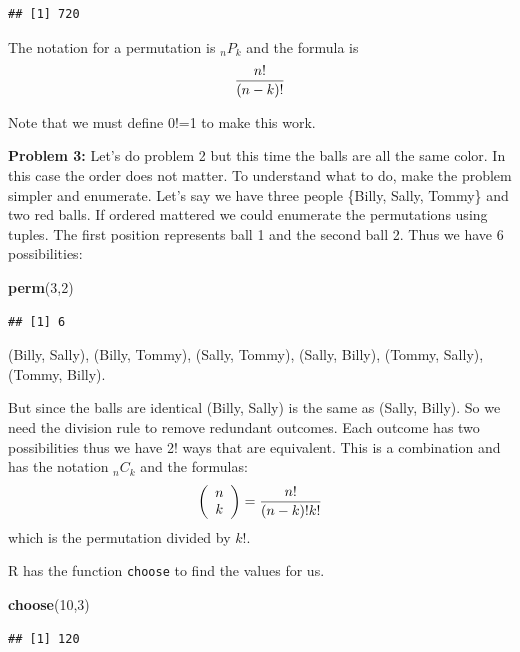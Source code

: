 \documentclass[]{book}
\newenvironment{Shaded}{\begin{snugshade}}{\end{snugshade}}
\newcommand{\KeywordTok}[1]{\textcolor[rgb]{0.13,0.29,0.53}{\textbf{#1}}}
\newcommand{\DecValTok}[1]{\textcolor[rgb]{0.00,0.00,0.81}{#1}}
\newcommand{\NormalTok}[1]{#1}
\theoremstyle{definition}
\theoremstyle{definition}
\theoremstyle{definition}
\theoremstyle{remark}
\begin{document}
\begin{verbatim}
## [1] 720
\end{verbatim}

The notation for a permutation is \(_{n}P_{k}\) and the formula is
\[{n! \over (n-k)!}\]

Note that we must define 0!=1 to make this work.

\textbf{Problem 3:} Let's do problem 2 but this time the balls are all
the same color. In this case the order does not matter. To understand
what to do, make the problem simpler and enumerate. Let's say we have
three people \{Billy, Sally, Tommy\} and two red balls. If ordered
mattered we could enumerate the permutations using tuples. The first
position represents ball 1 and the second ball 2. Thus we have 6
possibilities:

\begin{Shaded}
\begin{Highlighting}[]
\KeywordTok{perm}\NormalTok{(}\DecValTok{3}\NormalTok{,}\DecValTok{2}\NormalTok{)}
\end{Highlighting}
\end{Shaded}

\begin{verbatim}
## [1] 6
\end{verbatim}

(Billy, Sally), (Billy, Tommy), (Sally, Tommy), (Sally, Billy), (Tommy,
Sally), (Tommy, Billy).

But since the balls are identical (Billy, Sally) is the same as (Sally,
Billy). So we need the division rule to remove redundant outcomes. Each
outcome has two possibilities thus we have 2! ways that are equivalent.
This is a combination and has the notation \(_{n}C_{k}\) and the
formulas:
\[\left( {\begin{array}{c}n \\ k \end{array}} \right) = {n! \over (n-k)!k!}\]
which is the permutation divided by \(k!\).

R has the function \texttt{choose} to find the values for us.

\begin{Shaded}
\begin{Highlighting}[]
\KeywordTok{choose}\NormalTok{(}\DecValTok{10}\NormalTok{,}\DecValTok{3}\NormalTok{)}
\end{Highlighting}
\end{Shaded}

\begin{verbatim}
## [1] 120
\end{verbatim}
\end{document}
